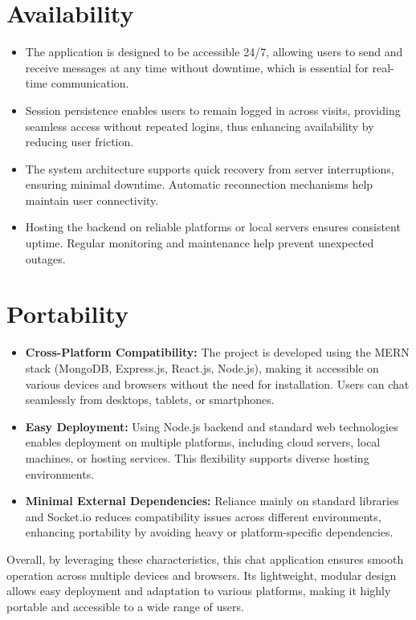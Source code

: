 \documentclass[12pt,a4paper]{report}
\begin{document}
\section{Availability}
\begin{itemize}
    \item The application is designed to be accessible 24/7, allowing users to send and receive messages at any time without downtime, which is essential for real-time communication.
    \item Session persistence enables users to remain logged in across visits, providing seamless access without repeated logins, thus enhancing availability by reducing user friction.
    \item The system architecture supports quick recovery from server interruptions, ensuring minimal downtime. Automatic reconnection mechanisms help maintain user connectivity.
    \item Hosting the backend on reliable platforms or local servers ensures consistent uptime. Regular monitoring and maintenance help prevent unexpected outages.
\end{itemize}

\section{Portability}
\begin{itemize}
    \item \textbf{Cross-Platform Compatibility:}  The project is developed using the MERN stack (MongoDB, Express.js, React.js, Node.js), making it accessible on various devices and browsers without the need for installation. Users can chat seamlessly from desktops, tablets, or smartphones.
    \item \textbf{Easy Deployment:} Using Node.js backend and standard web technologies enables deployment on multiple platforms, including cloud servers, local machines, or hosting services. This flexibility supports diverse hosting environments.
    \item \textbf{Minimal External Dependencies:} Reliance mainly on standard libraries and Socket.io reduces compatibility issues across different environments, enhancing portability by avoiding heavy or platform-specific dependencies.
\end{itemize}

Overall, by leveraging these characteristics, this chat application ensures smooth operation across multiple devices and browsers. Its lightweight, modular design allows easy deployment and adaptation to various platforms, making it highly portable and accessible to a wide range of users.
\end{document}
